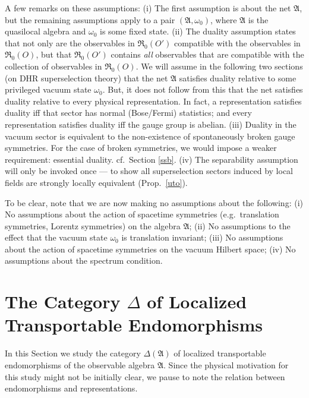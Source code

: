 \documentclass[11pt]{article}
\newcommand{\alg}[1]{\mathfrak{#1}}
\theoremstyle{definition}
\theoremstyle{definition}
\theoremstyle{remark}
\def\al#1{{\mathfrak #1}}
\def\om{\omega} \def\Om{\Omega} \def\dd{\partial} \def\D{\Delta}
\begin{document}
A few remarks on these assumptions: (i) The first assumption is about
the net $\al A$, but the remaining assumptions apply to a pair $(\al
A,\om _0)$, where $\al A$ is the quasilocal algebra and $\om _0$ is
some fixed state.  (ii) The duality assumption states that not only
are the observables in $\alg{R}_0(O')$ compatible with the observables
in $\alg{R}_0(O)$, but that $\alg{R}_0(O')$ contains \emph{all}
observables that are compatible with the collection of observables in
$\alg{R}_0(O)$.  We will assume in the following two sections (on DHR
superselection theory) that the net $\alg{A}$ satisfies duality
relative to some privileged vacuum state $\om _0$.  But, it does not
follow from this that the net satisfies duality relative to every
physical representation.  In fact, a representation satisfies duality
iff that sector has normal (Bose/Fermi) statistics; and every
representation satisfies duality iff the gauge group is abelian.
(iii) Duality in the vacuum sector is equivalent to the non-existence
of spontaneously broken gauge symmetries.  For the case of broken
symmetries, we would impose a weaker requirement: essential duality.
cf.\ Section \ref{ssb}.  (iv) The separability assumption will only be
invoked once --- to show all superselection sectors induced by local
fields are strongly locally equivalent (Prop.\ \ref{uto}).

To be clear, note that we are now making no assumptions about the
following: (i) No assumptions about the action of spacetime symmetries
(e.g.\ translation symmetries, Lorentz symmetries) on the algebra $\al
A$; (ii) No assumptions to the effect that the vacuum state $\om _0$
is translation invariant; (iii) No assumptions about the action of
spacetime symmetries on the vacuum Hilbert space; (iv) No assumptions
about the spectrum condition.


\section{The Category $\D$ of Localized Transportable Endomorphisms}

In this Section we study the category $\D (\al A)$ of localized
transportable endomorphisms of the observable algebra $\al A$.  Since
the physical motivation for this study might not be initially clear,
we pause to note the relation between endomorphisms and
representations.
\end{document}
